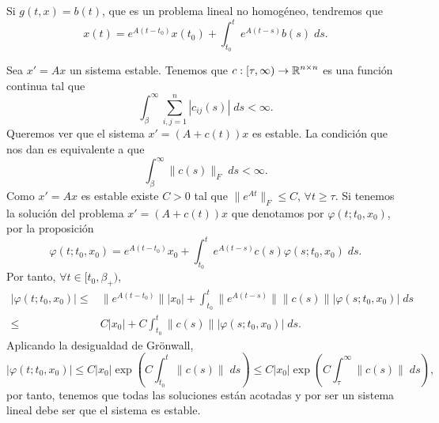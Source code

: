 \begin{observation}
Si $\displaystyle g\left(t, x\right)=b\left(t\right) $, que es un problema lineal no homogéneo, tendremos que 
\[x\left(t\right)=e^{A\left(t-t_{0}\right)}x\left(t_{0}\right)+\int^{t}_{t_{0}} e^{A\left(t-s\right)}b\left(s\right) \; d s  .\]
\end{observation}
\begin{eg}[Problema 25]
Sea $\displaystyle x ' = Ax $ un sistema estable. Tenemos que $\displaystyle c : [\tau, \infty) \to \mathbb{R}^{n \times n} $ es una función continua tal que 
\[\int^{\infty}_{\beta } \sum^{n}_{i,j = 1} \left|c_{ij}\left(s\right)\right| \; d s < \infty .\]
Queremos ver que el sistema $\displaystyle x'=\left(A + c\left(t\right)\right)x $ es estable. La condición que nos dan es equivalente a que 
\[ \int^{\infty}_{\beta } \|c\left(s\right)\|_{F} \; d s < \infty .\]
Como $\displaystyle x' = Ax $ es estable existe $\displaystyle C > 0 $ tal que $\displaystyle \|e^{At}\|_{F}\leq C $, $\displaystyle \forall t \geq \tau $. Si tenemos la solución del problema $\displaystyle x' = \left(A + c\left(t\right)\right)x $ que denotamos por $\displaystyle \varphi\left(t; t_{0}, x_{0}\right) $, por la proposición
\[\varphi\left(t; t_{0}, x_{0}\right) = e^{A\left(t-t_{0}\right)}x_{0} + \int^{t}_{t_{0}} e^{A\left(t-s\right)}c\left(s\right)\varphi\left(s; t_{0}, x_{0}\right) \; d s .\]
Por tanto, $\displaystyle \forall t \in [t_{0}, \beta_{+ }) $,
\[
\begin{split}
	\left|\varphi\left(t; t_{0}, x_{0}\right)\right| \leq & \|e^{A\left(t-t_{0}\right)}\| \left|x_{0}\right| + \int^{t}_{t_{0}} \|e^{A\left(t-s\right)}\| \|c\left(s\right)\| \left|\varphi\left(s; t_{0}, x_{0}\right)\right| \; d s  \\
	\leq & C \left|x_{0}\right| +C \int^{t}_{t_{0}} \|c\left(s\right)\| \left|\varphi\left(s; t_{0}, x_{0}\right)\right| \; d s .
\end{split}
\]
Aplicando la desigualdad de Grönwall, 
\[ \left|\varphi\left(t; t_{0}, x_{0}\right)\right| \leq C \left|x_{0}\right|\exp\left(C\int^{t}_{t_{0}} \|c\left(s\right)\| \; d s\right)\leq C \left|x_{0}\right|\exp\left(C\int^{\infty }_{\tau} \|c\left(s\right)\|  \; d s\right) ,\]
por tanto, tenemos que todas las soluciones están acotadas y por ser un sistema lineal debe ser que el sistema es estable. 
\end{eg}

